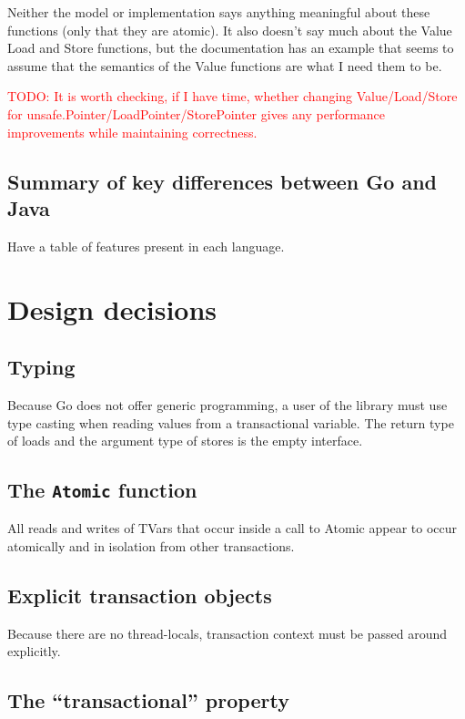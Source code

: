 \documentclass[12pt,a4paper,oneside,openright]{report}
\newcommand{\todo}[1]{\textcolor{red}{TODO: #1}}
\newcommand{\goFunc}[1]{\texttt{#1}}
\begin{document}
Neither the model or implementation says anything meaningful about
these functions (only that they are atomic). It also doesn't say much
about the Value Load and Store functions, but the documentation has an
example that seems to assume that the semantics of the Value functions
are what I need them to be.

\todo{It is worth checking, if I have time, whether changing
  Value/Load/Store for unsafe.Pointer/LoadPointer/StorePointer gives
  any performance improvements while maintaining correctness.}

\subsection{Summary of key differences between Go and Java}
\label{sec:prep:summ-key-diff}

Have a table of features present in each language.

\section{Design decisions}
\label{sec:prep:design-decisions}

\subsection{Typing}
\label{sec:prep:typing}

Because Go does not offer generic programming, a user of the library
must use type casting when reading values from a transactional
variable. The return type of loads and the argument type of stores is
the empty interface.

\subsection{The \goFunc{Atomic} function}
\label{sec:prep:atomic-function}

All reads and writes of TVars that occur inside a call to Atomic
appear to occur atomically and in isolation from other transactions.

\subsection{Explicit transaction objects}
\label{sec:prep:expl-trans-objects}

Because there are no thread-locals, transaction context must be passed
around explicitly.

\subsection{The ``transactional'' property}
\label{sec:prep:cont-trans-prop}
\end{document}
